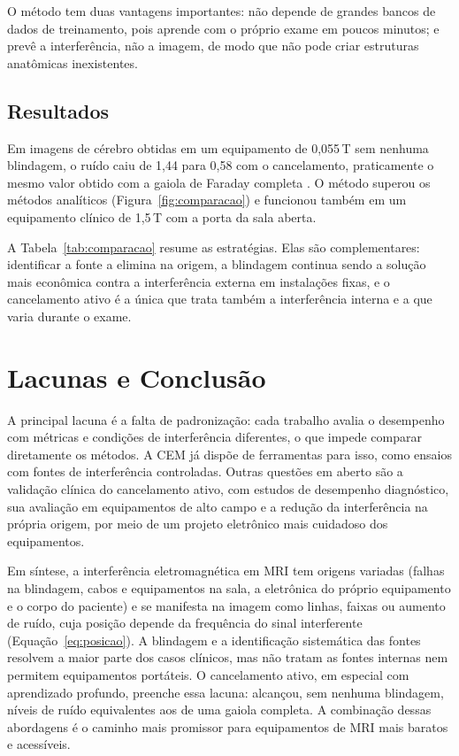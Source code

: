 \documentclass[portuguese]{sbcreviews-2025}%
\begin{document}
O método tem duas vantagens importantes: não depende de grandes bancos de dados de treinamento, pois aprende com o próprio exame em poucos minutos; e prevê a interferência, não a imagem, de modo que não pode criar estruturas anatômicas inexistentes.

\subsection{Resultados}

Em imagens de cérebro obtidas em um equipamento de 0,055\,T sem nenhuma blindagem, o ruído caiu de 1,44 para 0,58 com o cancelamento, praticamente o mesmo valor obtido com a gaiola de Faraday completa \citep{zhao2024emi}. O método superou os métodos analíticos (Figura~\ref{fig:comparacao}) e funcionou também em um equipamento clínico de 1,5\,T com a porta da sala aberta.

A Tabela~\ref{tab:comparacao} resume as estratégias. Elas são complementares: identificar a fonte a elimina na origem, a blindagem continua sendo a solução mais econômica contra a interferência externa em instalações fixas, e o cancelamento ativo é a única que trata também a interferência interna e a que varia durante o exame.




\section{Lacunas e Conclusão}
\label{sec:conclusao}

A principal lacuna é a falta de padronização: cada trabalho avalia o desempenho com métricas e condições de interferência diferentes, o que impede comparar diretamente os métodos. A CEM já dispõe de ferramentas para isso, como ensaios com fontes de interferência controladas. Outras questões em aberto são a validação clínica do cancelamento ativo, com estudos de desempenho diagnóstico, sua avaliação em equipamentos de alto campo \citep{zhao2024emi} e a redução da interferência na própria origem, por meio de um projeto eletrônico mais cuidadoso dos equipamentos.

Em síntese, a interferência eletromagnética em MRI tem origens variadas (falhas na blindagem, cabos e equipamentos na sala, a eletrônica do próprio equipamento e o corpo do paciente) e se manifesta na imagem como linhas, faixas ou aumento de ruído, cuja posição depende da frequência do sinal interferente (Equação~\eqref{eq:posicao}). A blindagem e a identificação sistemática das fontes resolvem a maior parte dos casos clínicos, mas não tratam as fontes internas nem permitem equipamentos portáteis. O cancelamento ativo, em especial com aprendizado profundo, preenche essa lacuna: alcançou, sem nenhuma blindagem, níveis de ruído equivalentes aos de uma gaiola completa. A combinação dessas abordagens é o caminho mais promissor para equipamentos de MRI mais baratos e acessíveis.
\end{document}
